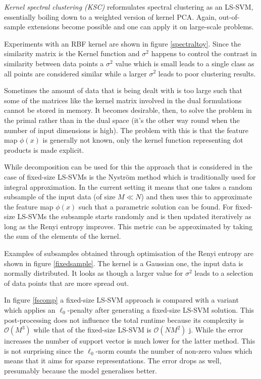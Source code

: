 \par \textit{Kernel spectral clustering (KSC)} reformulates spectral clustering as an LS-SVM, essentially boiling down to a weighted version of kernel PCA. Again, out-of-sample extensions become possible and one can apply it on large-scale problems. 

\par Experiments with an RBF kernel are shown in figure \ref{spectraltoy}. Since the similarity matrix is the Kernel function and $\sigma^2$ happens to control the contrast in similarity between data points a $\sigma^2$ value which is small leads to a single class as all points are considered similar while a larger $\sigma^2$ leads to poor clustering results.


Sometimes the amount of data that is being dealt with is too large such that some of the matrices like the kernel matrix involved in the dual formulations cannot be stored in memory. It becomes desirable, then, to solve the problem in the primal rather than in the dual space (it's the other way round when the number of input dimensions is high). The problem with this is that the feature map $\phi(x)$ is generally not known, only the kernel function representing dot products is made explicit.

\par While decomposition can be used for this the approach that is considered in the case of fixed-size LS-SVMs is the Nystr\"om method which is traditionally used for integral approximation. In the current setting it means that one takes a random subsample of the input data (of size $M\ll N$) and then uses this to approximate the feature map $\phi(x)$ such that a parametric solution can be found. For fixed-size LS-SVMs the subsample starts randomly and is then updated iteratively as long as the Renyi entropy improves. This metric can be approximated by taking the sum of the elements of the kernel.

\par Examples of subsamples obtained through optimisation of the Renyi entropy are shown in figure \ref{fixedsample}. The kernel is a Gaussian one, the input data is normally distributed. It looks as though a larger value for $\sigma^2$ leads to a selection of data points that are more spread out.

\par In figure \ref{fscomp} a fixed-size LS-SVM approach is compared with a variant which applies an $\ell_0$-penalty after generating a fixed-size LS-SVM solution. This post-processing does not influence the total runtime because its complexity is $\mathcal{O}(M^3)$ while that of the fixed-size LS-SVM is $\mathcal{O}(NM^2)$ j. While the error increases the number of support vector is much lower for the latter method. This is not surprising since the $\ell_0$-norm counts the number of non-zero values which means that it aims for sparse representations. The error drops as well, presumably because the model generalises better.

